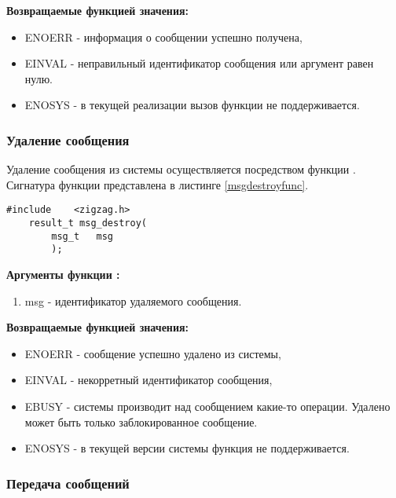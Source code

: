{\bfseries Возвращаемые функцией  значения:}

{\itshape
\begin{itemize}
\item ENOERR - информация о сообщении успешно получена,
\item EINVAL - неправильный идентификатор сообщения или аргумент  равен нулю.
\item ENOSYS - в текущей реализации вызов функции не поддерживается.
\end{itemize}
}

\subsubsection{Удаление сообщения}

Удаление сообщения из системы осуществляется посредством функции . 
Сигнатура функции представлена в листинге \ref{msgdestroyfunc}.

\begin{lstlisting}[caption=Функция \myfunc{msg\_destroy()} - удаление сообщения., label=msgdestroyfunc ]
    #include    <zigzag.h>
    result_t msg_destroy(
        msg_t   msg
        );
\end{lstlisting}

{\bfseries Аргументы функции :}

{\itshape
\begin{enumerate}
\item msg - идентификатор удаляемого сообщения.
\end{enumerate}
}

{\bfseries Возвращаемые функцией  значения:}

{\itshape
\begin{itemize}
\item ENOERR - сообщение успешно удалено из системы,
\item EINVAL - некорретный идентификатор сообщения,
\item EBUSY - системы производит над сообщением какие-то операции. Удалено может быть только 
заблокированное сообщение.
\item ENOSYS - в текущей версии системы функция не поддерживается.
\end{itemize}
}

\subsubsection{Передача сообщений}

